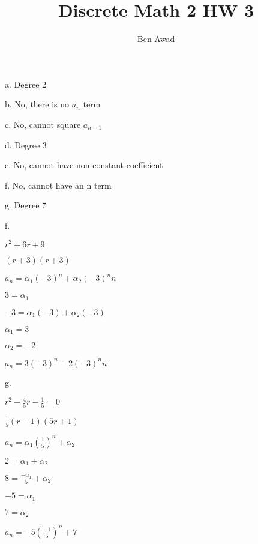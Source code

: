\documentclass[12pt]{article}
\newenvironment{problem}[2][Problem]{\begin{trivlist}
\item[\hskip \labelsep {\bfseries #1}\hskip \labelsep {\bfseries #2.}]}{\end{trivlist}}
\begin{document}
 
 
\title{Discrete Math 2 HW 3}
\author{Ben Awad}
\maketitle
 
\begin{problem}{8.2.2 a-g}
\end{problem}

a. Degree 2

b. No, there is no $a_n$ term

c. No, cannot square $a_{n-1}$

d. Degree 3

e. No, cannot have non-constant coefficient

f. No, cannot have an n term

g. Degree 7

\begin{problem}{8.2.4 f,g}
\end{problem}

f. 

$r^2+6r+9$

$(r+3)(r+3)$

$a_n = \alpha_1(-3)^n + \alpha_2(-3)^nn$

$3 = \alpha_1$

$-3=\alpha_1(-3) + \alpha_2(-3)$

$\alpha_1 = 3$

$\alpha_2 = -2$

$a_n = 3(-3)^n - 2(-3)^nn$

g.

$r^2-\frac{4}{5}r-\frac{1}{5}=0$

$\frac{1}{5}(r-1)(5r+1)$

$a_n = \alpha_1(\frac{1}{5})^n + \alpha_2$

$2 = \alpha_1 + \alpha_2$

$8 = \frac{-\alpha_1}{5} + \alpha_2$

$-5 = \alpha_1$

$7 = \alpha_2$

$a_n = -5(\frac{-1}{5})^n + 7$

\begin{problem}{8.2.22}
\end{problem}
\end{document}
